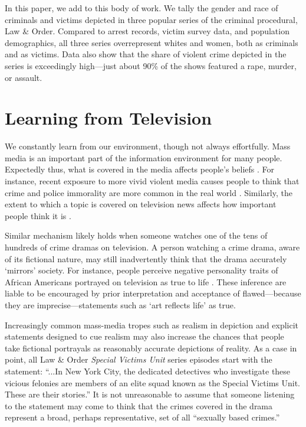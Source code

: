 \documentclass[12pt, letterpaper]{article}
\begin{document}


In this paper, we add to this body of work. We tally the gender and race of criminals and victims depicted in three popular series of the criminal procedural, Law \& Order. Compared to arrest records, victim survey data, and population demographics, all three series overrepresent whites and women, both as criminals and as victims. Data also show that the share of violent crime depicted in the series is exceedingly high---just about 90\% of the shows featured a rape, murder, or assault.

\section*{Learning from Television}
We constantly learn from our environment, though not always effortfully. Mass media is an important part of the information environment for many people. Expectedly thus, what is covered in the media affects people's beliefs \citep{gerbner1986living, shanahan1999television}. For instance, recent exposure to more vivid violent media causes people to think that crime and police immorality are more common in the real world \citep{riddle2010always}. Similarly, the extent to which a topic is covered on television news affects how important people think it is \citep{mccombs1972agenda, iyengar2010news, iyengar1990accessibility}. 

Similar mechanism likely holds when someone watches one of the tens of hundreds of crime dramas on television. A person watching a crime drama, aware of its fictional nature, may still inadvertently think that the drama accurately `mirrors' society. For instance, people perceive negative personality traits of African Americans portrayed on television as true to life \citep{punyanunt2008perceived}. These inference are liable to be encouraged by prior interpretation and acceptance of flawed---because they are imprecise---statements such as `art reflects life' as true. 

Increasingly common mass-media tropes such as realism in depiction and explicit statements designed to cue realism may also increase the chances that people take fictional portrayals as reasonably accurate depictions of reality. As a case in point, all Law \& Order \textit{Special Victims Unit} series episodes start with the statement: ``...In New York City, the dedicated detectives who investigate these vicious felonies are members of an elite squad known as the Special Victims Unit. These are their stories.'' It is not unreasonable to assume that someone listening to the statement may come to think that the crimes covered in the drama represent a broad, perhaps representative, set of all ``sexually based crimes.''
\end{document}
